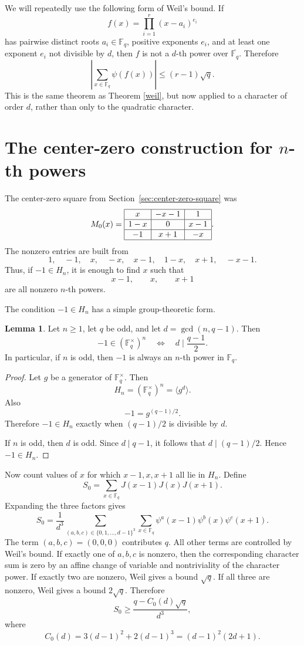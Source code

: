 \documentclass{article}
\newcommand{\F}{\mathbb F}
\theoremstyle{definition}
\newtheorem{lemma}{Lemma}
\numberwithin{equation}{section}
\begin{document}
We will repeatedly use the following form of Weil's bound.  If
\[
f(x)=\prod_{i=1}^r (x-a_i)^{e_i}
\]
has pairwise distinct roots \(a_i\in\F_q\), positive exponents \(e_i\), and at least one exponent \(e_i\) not divisible by
\(d\), then \(f\) is not a \(d\)-th power over \(\overline{\F_q}\).  Therefore
\[
\left|\sum_{x\in\F_q}\psi(f(x))\right|\leq (r-1)\sqrt q.
\]
This is the same theorem as Theorem \ref{weil}, but now applied to a character
of order \(d\), rather than only to the quadratic character.

\section{The center-zero construction for \(n\)-th powers}

The center-zero square from Section~\ref{sec:center-zero-square} was
\[
M_0(x)=
\begin{array}{|c|c|c|}
\hline
x & -x-1 & 1\\
\hline
1-x & 0 & x-1\\
\hline
-1 & x+1 & -x \\
\hline
\end{array}.
\]
The nonzero entries are built from
\[
1,\quad -1,\quad x,\quad -x,\quad x-1,\quad 1-x,\quad x+1,\quad -x-1.
\]
Thus, if \(-1\in H_n\), it is enough to find \(x\) such that
\[
x-1,\qquad x,
\qquad x+1
\]
are all nonzero \(n\)-th powers.

The condition \(-1\in H_n\) has a simple group-theoretic form.

\begin{lemma}
Let \(n\geq1\), let \(q\) be odd, and let \(d=\gcd(n,q-1)\). Then
\[
-1\in (\F_q^\times)^n
\quad\Longleftrightarrow\quad
 d\mid \frac{q-1}{2}.
\]
In particular, if \(n\) is odd, then \(-1\) is always an \(n\)-th power in
\(\F_q\).
\end{lemma}

\begin{proof}
Let \(g\) be a generator of \(\F_q^\times\).  Then
\[
H_n=(\F_q^\times)^n=\langle g^d\rangle.
\]
Also
\[
-1=g^{(q-1)/2}.
\]
Therefore \(-1\in H_n\) exactly when \((q-1)/2\) is divisible by \(d\).

If \(n\) is odd, then \(d\) is odd.  Since \(d\mid q-1\), it follows that
\(d\mid (q-1)/2\).  Hence \(-1\in H_n\).
\end{proof}

Now count values of \(x\) for which \(x-1,x,x+1\) all lie in \(H_n\).  Define
\[
S_0=\sum_{x\in\F_q}J(x-1)J(x)J(x+1).
\]
Expanding the three factors gives
\[
S_0
=
\frac{1}{d^3}
\sum_{(a,b,c)\in\{0,1,\dots,d-1\}^3}
\sum_{x\in\F_q}
\psi^a(x-1)\psi^b(x)\psi^c(x+1).
\]
The term \((a,b,c)=(0,0,0)\) contributes \(q\).  All other terms are controlled
by Weil's bound.  If exactly one of \(a,b,c\) is nonzero, then the corresponding
character sum is zero by an affine change of variable and nontriviality of the character power.  If exactly two are nonzero, Weil gives a bound
\(\sqrt q\).  If all three are nonzero, Weil gives a bound \(2\sqrt q\).
Therefore
\[
S_0\geq
\frac{q-C_0(d)\sqrt q}{d^3},
\]
where
\[
C_0(d)=3(d-1)^2+2(d-1)^3=(d-1)^2(2d+1).
\]
\end{document}
